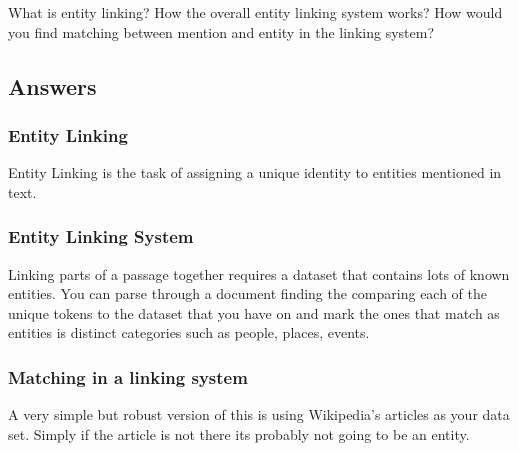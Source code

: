 What is entity linking? 
How the overall entity linking system works? 
How would you find matching between mention and entity in the linking system?

\subsection*{Answers}

\subsubsection*{Entity Linking}
Entity Linking is the task of assigning a unique identity to entities mentioned in text.

\subsubsection*{Entity Linking System}
Linking parts of a passage together requires a dataset that contains lots of known entities.
You can parse through a document finding the comparing each of the unique tokens to the dataset that you have on and mark the ones that match as entities is distinct categories such as people, places, events. 

\subsubsection*{Matching in a linking system}
A very simple but robust version of this is using Wikipedia's articles as your data set.
Simply if the article is not there its probably not going to be an entity. 


